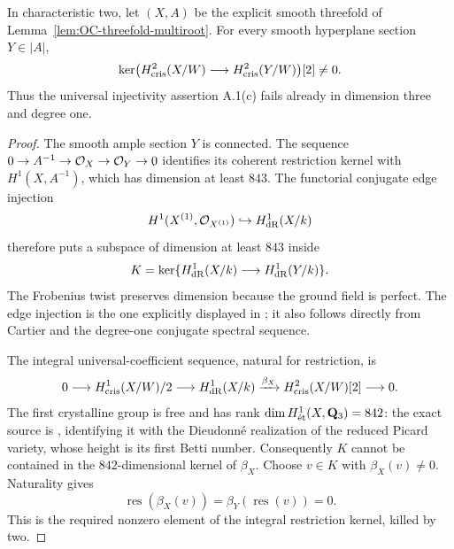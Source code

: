 \begin{theorem}
\label{thm:OC-integral-injectivity-counterexample}
In characteristic two, let $(X,A)$ be the explicit smooth threefold of Lemma~\ref{lem:OC-threefold-multiroot}.  For every smooth hyperplane section $Y\in|A|$,
\[
 \ker\bigl(H^2_{\cris}(X/W)\longrightarrow H^2_{\cris}(Y/W)\bigr)[2]
                         \ne0.
\]
Thus the universal injectivity assertion A.1(c) fails already in dimension three and degree one.
\end{theorem}
\begin{proof}
The smooth ample section $Y$ is connected.  The sequence
$0\to A^{-1}\to\OO_X\to\OO_Y\to0$ identifies its coherent restriction kernel with $H^1(X,A^{-1})$, which has dimension at least $843$.  The functorial conjugate edge injection
\[
           H^1(X^{(1)},\OO_{X^{(1)}})\hookrightarrow H^1_{\dR}(X/k)
\]
therefore puts a subspace of dimension at least $843$ inside
\[
       K=\ker\{H^1_{\dR}(X/k)\longrightarrow H^1_{\dR}(Y/k)\}.
\]
The Frobenius twist preserves dimension because the ground field is perfect.  The edge injection is the one explicitly displayed in
\cite[II, Section~6.14, p.~649]{Illusie1979DRW}; it also follows directly from Cartier and the degree-one conjugate spectral sequence.

The integral universal-coefficient sequence, natural for restriction, is
\[
 0\longrightarrow H^1_{\cris}(X/W)/2
 \longrightarrow H^1_{\dR}(X/k)
 \xrightarrow{\beta_X}H^2_{\cris}(X/W)[2]\longrightarrow0.
\]
The first crystalline group is free and has rank
$\dim H^1_{\et}(X,\mathbf Q_3)=842$: the exact source is
\cite[II, Proposition~3.11 and Remark~3.11.2, pp.~618--619]{Illusie1979DRW}, identifying it with the Dieudonn\'e realization of the reduced Picard variety, whose height is its first Betti number.  Consequently $K$ cannot be contained in the $842$-dimensional kernel of $\beta_X$.  Choose $v\in K$ with $\beta_X(v)\ne0$.  Naturality gives
\[
       \operatorname{res}(\beta_X(v))
         =\beta_Y(\operatorname{res}(v))=0.
\]
This is the required nonzero element of the integral restriction kernel, killed by two.
\end{proof}

